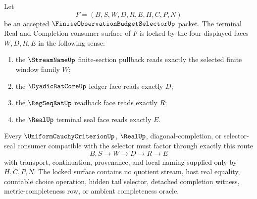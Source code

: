 \begin{theorem}
\label{thm:finite-observation-budget-selector-terminal-four-face-pullback-lock}
Let
$$
F=(B,S,W,D,R,E,H,C,P,N)
$$
be an accepted $\FiniteObservationBudgetSelectorUp$ packet. The terminal Real-and-Completion consumer surface of $F$ is locked by the four displayed faces $W,D,R,E$ in the following sense:
\begin{enumerate}
\item the $\StreamNameUp$ finite-section pullback reads exactly the selected finite window family $W$;
\item the $\DyadicRatCoreUp$ ledger face reads exactly $D$;
\item the $\RegSeqRatUp$ readback face reads exactly $R$;
\item the $\RealUp$ terminal seal face reads exactly $E$.
\end{enumerate}
Every $\UniformCauchyCriterionUp$, $\RealUp$, diagonal-completion, or selector-seal consumer compatible with the selector must factor through exactly this route
$$
B,S \to W \to D \to R \to E
$$
with transport, continuation, provenance, and local naming supplied only by $H,C,P,N$. The locked surface contains no quotient stream, host real equality, countable choice operation, hidden tail selector, detached completion witness, metric-completeness row, or ambient completeness oracle.
\end{theorem}
